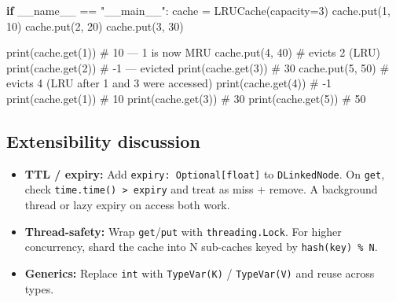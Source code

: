 \documentclass[11pt]{article}
\providecommand{\tightlist}{\setlength{\itemsep}{1pt}\setlength{\parskip}{0pt}}
\newenvironment{Shaded}{\begin{snugshade}}{\end{snugshade}}
\newcommand{\BuiltInTok}[1]{\textcolor[rgb]{0.50,0.55,0.55}{#1}}
\newcommand{\CommentTok}[1]{\textcolor[rgb]{0.48,0.49,0.49}{#1}}
\newcommand{\ControlFlowTok}[1]{\textcolor[rgb]{0.99,0.74,0.29}{\textbf{#1}}}
\newcommand{\DecValTok}[1]{\textcolor[rgb]{0.96,0.45,0.00}{#1}}
\newcommand{\NormalTok}[1]{\textcolor[rgb]{0.81,0.81,0.76}{#1}}
\newcommand{\OperatorTok}[1]{\textcolor[rgb]{0.81,0.81,0.76}{#1}}
\newcommand{\StringTok}[1]{\textcolor[rgb]{0.96,0.31,0.31}{#1}}
\newcommand{\VariableTok}[1]{\textcolor[rgb]{0.15,0.68,0.68}{#1}}
\begin{document}
\begin{Shaded}
\begin{Highlighting}[]
\ControlFlowTok{if} \VariableTok{\_\_name\_\_} \OperatorTok{==} \StringTok{"\_\_main\_\_"}\NormalTok{:}
\NormalTok{    cache }\OperatorTok{=}\NormalTok{ LRUCache(capacity}\OperatorTok{=}\DecValTok{3}\NormalTok{)}
\NormalTok{    cache.put(}\DecValTok{1}\NormalTok{, }\DecValTok{10}\NormalTok{)}
\NormalTok{    cache.put(}\DecValTok{2}\NormalTok{, }\DecValTok{20}\NormalTok{)}
\NormalTok{    cache.put(}\DecValTok{3}\NormalTok{, }\DecValTok{30}\NormalTok{)}

    \BuiltInTok{print}\NormalTok{(cache.get(}\DecValTok{1}\NormalTok{))   }\CommentTok{\# 10  — 1 is now MRU}
\NormalTok{    cache.put(}\DecValTok{4}\NormalTok{, }\DecValTok{40}\NormalTok{)      }\CommentTok{\# evicts 2 (LRU)}
    \BuiltInTok{print}\NormalTok{(cache.get(}\DecValTok{2}\NormalTok{))   }\CommentTok{\# {-}1  — evicted}
    \BuiltInTok{print}\NormalTok{(cache.get(}\DecValTok{3}\NormalTok{))   }\CommentTok{\# 30}
\NormalTok{    cache.put(}\DecValTok{5}\NormalTok{, }\DecValTok{50}\NormalTok{)      }\CommentTok{\# evicts 4 (LRU after 1 and 3 were accessed)}
    \BuiltInTok{print}\NormalTok{(cache.get(}\DecValTok{4}\NormalTok{))   }\CommentTok{\# {-}1}
    \BuiltInTok{print}\NormalTok{(cache.get(}\DecValTok{1}\NormalTok{))   }\CommentTok{\# 10}
    \BuiltInTok{print}\NormalTok{(cache.get(}\DecValTok{3}\NormalTok{))   }\CommentTok{\# 30}
    \BuiltInTok{print}\NormalTok{(cache.get(}\DecValTok{5}\NormalTok{))   }\CommentTok{\# 50}
\end{Highlighting}
\end{Shaded}

\subsection{Extensibility discussion}\label{extensibility-discussion}

\begin{itemize}
\tightlist
\item
  \textbf{TTL / expiry:} Add \texttt{expiry:\ Optional{[}float{]}} to \texttt{DLinkedNode}. On \texttt{get}, check \texttt{time.time()\ \textgreater{}\ expiry} and treat as miss + remove. A background thread or lazy expiry on access both work.
\item
  \textbf{Thread-safety:} Wrap \texttt{get}/\texttt{put} with \texttt{threading.Lock}. For higher concurrency, shard the cache into N sub-caches keyed by \texttt{hash(key)\ \%\ N}.
\item
  \textbf{Generics:} Replace \texttt{int} with \texttt{TypeVar(\textquotesingle{}K\textquotesingle{})} / \texttt{TypeVar(\textquotesingle{}V\textquotesingle{})} and reuse across types.
\end{itemize}
\end{document}
